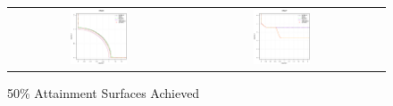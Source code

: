 \begin{figure}[h]
\centering
\caption{50\% Attainment Surfaces Achieved}
\label{fig:Attainment_Surfaces}
\begin{tabular}{ccc}
  \includegraphics[width=0.33\textwidth]{Surfaces/DTLZ6.eps} &
  \includegraphics[width=0.33\textwidth]{Surfaces/DTLZ7.eps} &
 

\end{tabular}
\end{figure}
